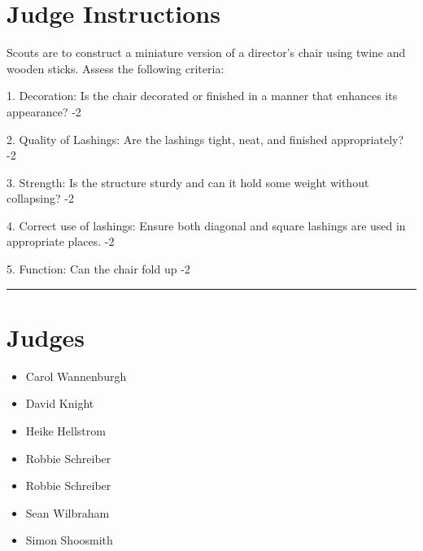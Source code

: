 \documentclass[10pt]{article}
\begin{document}
		\section*{Judge Instructions}
		Scouts are to construct a miniature version of a director's chair using twine and wooden sticks. Assess the following criteria:



1. Decoration: Is the chair decorated or finished in a manner that enhances its appearance? -2

2. Quality of Lashings: Are the lashings tight, neat, and finished appropriately? -2

3. Strength: Is the structure sturdy and can it hold some weight without collapsing? -2

4. Correct use of lashings: Ensure both diagonal and square lashings are used in appropriate places. -2

5. Function: Can the chair fold up -2


\vspace{0.5cm}
	\hrule
	\vspace{0.5cm}
		\section*{\faUsers \: Judges}

		

	\begin{multicols}{2}

		\begin{itemize}
									\item Carol Wannenburgh
									\item David Knight
									\item Heike Hellstrom
									\item Robbie Schreiber
						\end{itemize}

		\vfill\null
		\columnbreak

		\begin{itemize}
									\item Robbie Schreiber
									\item Sean Wilbraham
									\item Simon Shoosmith
						\end{itemize}

		\vfill\null

		\end{multicols}
\end{document}
